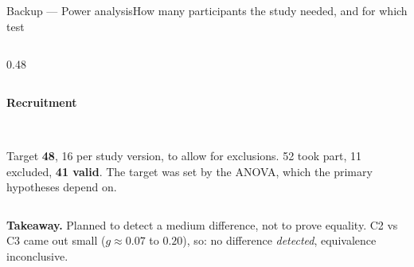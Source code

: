 \documentclass[aspectratio=169,10pt]{beamer}
\newcommand{\hl}[1]{{\color{knblue}\textbf{#1}}}
\newcommand{\panelheadsm}[1]{\noindent\colorbox{kncyan}{\parbox{0.96\textwidth}{\centering\vspace{1pt}\color{white}\tiny\bfseries #1\vspace{1pt}}}\\[0.2em]}
\newcommand{\takeaway}[1]{%
  \vfill
  \noindent\colorbox{knlight}{\parbox{0.975\textwidth}{\small\color{knblue}\textbf{Takeaway.} #1}}%
  \vspace{0.2em}}
\begin{document}
\begin{frame}{Backup — Power analysis}{How many participants the study needed, and for which test}
\begin{columns}[T,onlytextwidth]
\begin{column}{0.48\textwidth}
{\begin{tabular}{@{}>{\raggedright\arraybackslash}m{}>{\raggedright\arraybackslash}m{}>{\raggedright\arraybackslash}m{}@{}}
        \bottomrule
      \end{tabular}\par}
      \vspace{0.4em}
      \panelheadsm{Recruitment}
      \noindent\colorbox{knlight}{\parbox{0.96\textwidth}{\vspace{3pt}\scriptsize\raggedright
        Target \hl{48}, 16 per study version, to allow for exclusions. 52 took part, 11 excluded, \hl{41 valid}. The target was set by the ANOVA, which the primary hypotheses depend on.\vspace{3pt}}}
    \end{column}
  \end{columns}
  \takeaway{Planned to detect a medium difference, not to prove equality. C2 vs C3 came out small ($g\approx0.07$ to $0.20$), so: no difference \emph{detected}, equivalence inconclusive.}
\end{frame}
\end{document}
